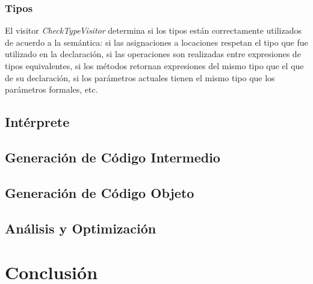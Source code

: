 \documentclass[11pt,a4paper]{article}
\begin{document}
\subsubsection{Tipos}
\label{subsec:tipos}

El visitor \textit{CheckTypeVisitor} determina si los tipos están correctamente utilizados de acuerdo a la semántica: si las asignaciones a locaciones respetan el tipo que fue utilizado en la declaración, si las operaciones son realizadas entre expresiones de tipos equivalentes, si los métodos retornan expresiones del mismo tipo que el que de su declaración, si los parámetros actuales tienen el mismo tipo que los parámetros formales, etc. 

\subsection{Intérprete} 
\label{subsec:interprete}

\subsection{Generación de Código Intermedio} 
\label{subsec:genci}

\subsection{Generación de Código Objeto} 
\label{subsec:genco}

\subsection{Análisis y Optimización} 
\label{subsec:opt}

\section{Conclusión} 
\label{sec:concl}
\end{document}
